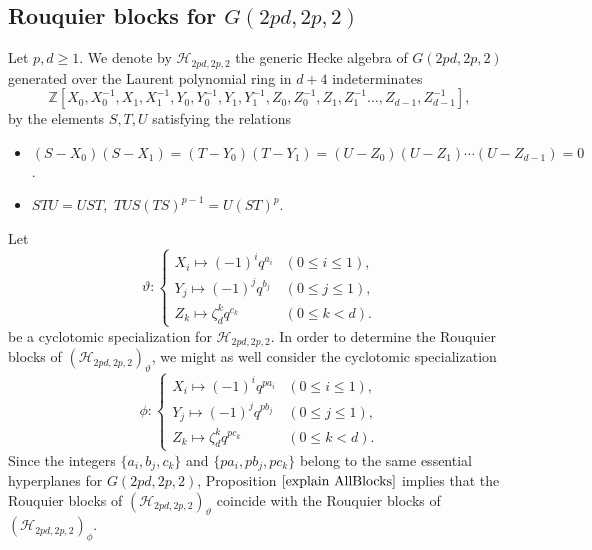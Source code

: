 \documentclass[10pt,a4paper,titlepage]{article}
\begin{document}
\subsection{Rouquier blocks for $G(2pd,2p,2)$}

 Let $p,d \geq 1$. We denote by $\mathcal{H}_{2pd,2p,2}$ the generic
 Hecke algebra of $G(2pd,2p,2)$  generated over the Laurent polynomial ring in $d+4$ indeterminates  
$$\mathbb{Z}[X_0,X_0^{-1},X_1,X_1^{-1},Y_0,Y_0^{-1},Y_1,Y_1^{-1},Z_0,Z_0^{-1},Z_1,Z_1^{-1}\ldots,Z_{d-1},Z_{d-1}^{-1}],$$
by the elements $S,T,U$ satisfying the relations
\begin{itemize}
\item $(S-X_0)(S-X_1)=(T-Y_0)(T-Y_1)=(U-Z_0)(U-Z_1)\cdots(U-Z_{d-1})=0$.
\item $STU=UST$, \,$TUS(TS)^{p-1}=U(ST)^{p}.$ 
\end{itemize}

Let $$\vartheta : \left\{ 
\begin{array}{ll} 
X_i \mapsto (-1)^i q^{a_i} &(0 \leq i \leq 1),\\
Y_j \mapsto (-1)^j q^{b_j} &(0 \leq j \leq 1),\\
Z_k \mapsto \zeta_{d}^{k} q^{c_k} &(0 \leq k <d).  
\end{array} \right. 
$$
be a cyclotomic specialization for  $\mathcal{H}_{2pd,2p,2}$. In order to determine the Rouquier blocks of 
$(\mathcal{H}_{2pd,2p,2})_\vartheta$, we might as well consider the cyclotomic specialization
$$\phi : \left\{ 
\begin{array}{ll} 
X_i \mapsto (-1)^i q^{pa_i} &(0 \leq i \leq 1),\\
Y_j \mapsto (-1)^j q^{pb_j} &(0 \leq j \leq 1),\\
Z_k \mapsto \zeta_{d}^{k} q^{pc_k} &(0 \leq k <d).  
\end{array} \right. 
$$
Since the integers $\{a_i,b_j,c_k\}$ and $\{pa_i,pb_j,pc_k\}$ belong to the same essential hyperplanes for $G(2pd,2p,2)$, Proposition $\ref{explain AllBlocks}$ implies that the Rouquier blocks of 
$(\mathcal{H}_{2pd,2p,2})_\vartheta$ coincide with the Rouquier blocks of 
$(\mathcal{H}_{2pd,2p,2})_\phi$.
\end{document}
